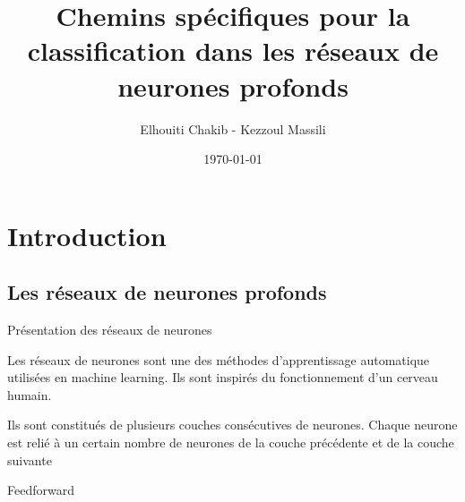 \documentclass[10pt,handout]{beamer}
\title[Chemins spécifiques]{Chemins spécifiques pour la classification dans les réseaux de neurones profonds}
\author[Elhouiti, Kezzoul]{ Elhouiti Chakib - Kezzoul Massili \\}
\institute[]{Université de Montpellier}
\date{\today}
\newif\ifplacelogo %
\begin{document}
\placelogofalse
\begin{frame}
	\titlepage
\end{frame}

\placelogotrue

\section{Introduction}
\subsection{Les réseaux de neurones profonds}
\placelogofalse
\begin{frame}{Présentation des réseaux de neurones}
    \begin{block}{}
        Les réseaux de neurones sont une des méthodes d'apprentissage automatique utilisées en machine learning. Ils sont inspirés du fonctionnement d'un cerveau humain. 
    \end{block}

    \begin{block}{}
        Ils sont constitués de plusieurs couches consécutives de neurones. Chaque neurone est relié à un certain nombre de neurones de la couche précédente et de la couche suivante
    \end{block}


\end{frame}

\begin{frame}{Feedforward}
\end{frame}
\placelogotrue
\end{document}
